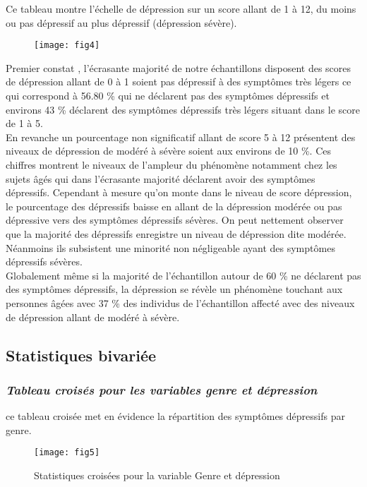 \documentclass[a4paper]{article}
\begin{document}
	Ce tableau montre l’échelle de dépression sur un score allant de 1 à 12, du moins ou pas dépressif au plus dépressif (dépression sévère).
	
	\begin{figure}[h!]
		\centering
		\texttt{[image: fig4]}
		\caption{}
		\label{la variable échelle de dépression}
	\end{figure}
	
	Premier constat , l’écrasante majorité de notre échantillons disposent des scores de dépression allant de 0 à 1 soient pas dépressif à des symptômes très légers ce qui correspond à 56.80 \% qui ne déclarent pas des symptômes dépressifs et environs 43 \% déclarent des symptômes dépressifs très légers situant dans le score de 1 à 5.\\
	En revanche un pourcentage non significatif  allant de score 5 à 12  présentent des niveaux de dépression de modéré à sévère soient aux environs de 10 \%. Ces chiffres montrent le niveaux de l’ampleur du phénomène notamment chez les sujets âgés qui dans l’écrasante majorité déclarent avoir des symptômes dépressifs. Cependant à mesure qu’on monte dans le niveau de score dépression, le pourcentage des dépressifs baisse en allant de la dépression modérée ou pas dépressive vers  des symptômes dépressifs sévères. On peut  nettement observer que la majorité des dépressifs enregistre un niveau de dépression dite modérée. Néanmoins ils subsistent une minorité non négligeable ayant des symptômes dépressifs sévères.\\
	Globalement même si la majorité de l’échantillon autour de 60 \% ne déclarent pas des symptômes dépressifs, la dépression se révèle un phénomène  touchant aux personnes âgées  avec 37 \% des individus de l’échantillon affecté avec des niveaux de dépression allant de modéré à sévère.\\
	
	\subsection{Statistiques bivariée} 
	\subsubsection{\textit{Tableau  croisés pour les variables genre et dépression} }
	ce tableau croisée met en évidence la répartition des symptômes dépressifs par genre.
	
	\begin{figure}[h!]
		\centering
		\texttt{[image: fig5]}
		\caption{Statistiques croisées pour la variable Genre et dépression}
		\label{fig:}
	\end{figure}
\end{document}
